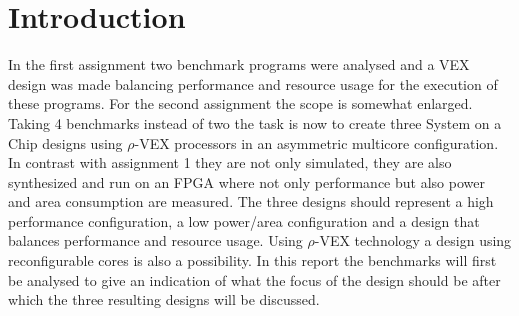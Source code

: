\section{Introduction}
In the first assignment two benchmark programs were analysed and a VEX design was made balancing performance and resource usage for the execution of these programs. For the second assignment the scope is somewhat enlarged. Taking 4 benchmarks instead of two the task is now to create three System on a Chip designs using $\rho$-VEX processors in an asymmetric multicore configuration. In contrast with assignment 1 they are not only simulated, they are also synthesized and run on an FPGA where not only performance but also power and area consumption are measured. The three designs should represent a high performance configuration, a low power/area configuration and a design that balances performance and resource usage. Using $\rho$-VEX technology a design using reconfigurable cores is also a possibility. In this report the benchmarks will first be analysed to give an indication of what the focus of the design should be after which the three resulting designs will be discussed.